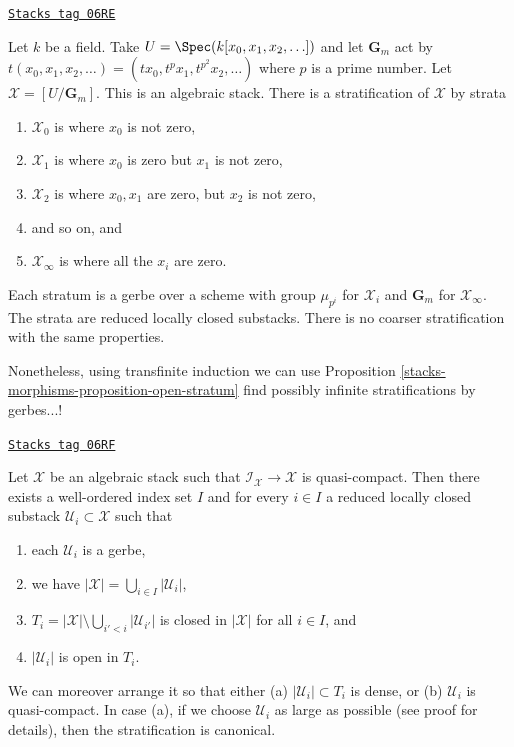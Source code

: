 \begin{example}
\label{stacks-morphisms-example-infinite-stratification}
\href{https://stacks.math.columbia.edu/tag/06RE}{\texttt{Stacks tag 06RE}}

Let $k$ be a field.
Take $U = \Spec(k[x_0, x_1, x_2, \ldots])$
and let $\mathbf{G}_m$ act by
$t(x_0, x_1, x_2, \ldots) = (tx_0, t^p x_1, t^{p^2} x_2, \ldots)$
where $p$ is a prime number. Let $\mathcal{X} = [U/\mathbf{G}_m]$.
This is an algebraic stack. There is a stratification of $\mathcal{X}$
by strata
\begin{enumerate}
\item $\mathcal{X}_0$ is where $x_0$ is not zero,
\item $\mathcal{X}_1$ is where $x_0$ is zero but $x_1$ is not zero,
\item $\mathcal{X}_2$ is where $x_0, x_1$ are zero, but $x_2$ is not zero,
\item and so on, and
\item $\mathcal{X}_{\infty}$ is where all the $x_i$ are zero.
\end{enumerate}
Each stratum is a gerbe over a scheme with group $\mu_{p^i}$ for
$\mathcal{X}_i$ and $\mathbf{G}_m$ for $\mathcal{X}_{\infty}$.
The strata are reduced locally closed substacks. There is no coarser
stratification with the same properties.
\end{example}

Nonetheless, using transfinite induction we can use
Proposition \ref{stacks-morphisms-proposition-open-stratum}
find possibly infinite stratifications by gerbes...!

\begin{lemma}
\label{stacks-morphisms-lemma-every-point-in-a-stratum}
\href{https://stacks.math.columbia.edu/tag/06RF}{\texttt{Stacks tag 06RF}}

Let $\mathcal{X}$ be an algebraic stack such that
$\mathcal{I}_\mathcal{X} \to \mathcal{X}$ is quasi-compact.
Then there exists a well-ordered index set $I$ and for every $i \in I$
a reduced locally closed substack $\mathcal{U}_i \subset \mathcal{X}$ such that
\begin{enumerate}
\item each $\mathcal{U}_i$ is a gerbe,
\item we have $|\mathcal{X}| = \bigcup_{i \in I} |\mathcal{U}_i|$,
\item $T_i = |\mathcal{X}| \setminus \bigcup_{i' < i} |\mathcal{U}_{i'}|$
is closed in $|\mathcal{X}|$ for all $i \in I$, and
\item $|\mathcal{U}_i|$ is open in $T_i$.
\end{enumerate}
We can moreover arrange it so that either (a) $|\mathcal{U}_i| \subset T_i$
is dense, or (b) $\mathcal{U}_i$ is quasi-compact. In case (a), if
we choose $\mathcal{U}_i$ as large as possible (see proof for details), then
the stratification is canonical.
\end{lemma}

